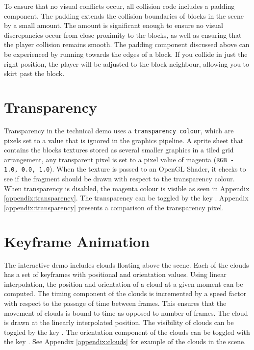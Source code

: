 \documentclass{book}
\begin{document}
To ensure that no visual conflicts occur, all collision code includes a padding component.  The padding extends the collision boundaries of blocks in the scene by a small amount.   The amount is significant enough to ensure no visual discrepancies occur from close proximity to the blocks, as well as ensuring that the player collision remains smooth.  The padding component discussed above can be experienced by running towards the edges of a block.  If you collide in just the right position, the player will be adjusted to the block neighbour, allowing you to skirt past the block.
   
\section{Transparency}
Transparency in the technical demo uses a \texttt{transparency colour}, which are pixels set to a value that is ignored in the graphics pipeline.  A sprite sheet that contains the blocks textures stored as several smaller graphics in a tiled grid arrangement, any transparent pixel is set to a pixel value of magenta (\texttt{RGB - 1.0, 0.0, 1.0}).  When the texture is passed to an OpenGL Shader, it checks to see if the fragment should be drawn with respect to the transparency colour.  When transparency is disabled, the magenta colour is visible as seen in Appendix \ref{appendix:transparency}.
\vskip 2.5mm\noindent
The transparency can be toggled by the key .  Appendix \ref{appendix:transparency} presents a comparison of the transparency pixel.
    
\section{Keyframe Animation}
The interactive demo includes clouds floating above the scene.  Each of the clouds has a set of keyframes with positional and orientation values.  Using linear interpolation, the position and orientation of a cloud at a given moment can be computed.  The timing component of the clouds is incremented by a speed factor with respect to the passage of time between frames.  This ensures that the movement of clouds is bound to time as opposed to number of frames.  The cloud is drawn at the linearly interpolated position.
\vskip 2.5mm\noindent
The visibility of clouds can be toggled by the key .  The orientation component of the clouds can be toggled with the key .  See Appendix \ref{appendix:clouds} for example of the clouds in the scene.
\end{document}
